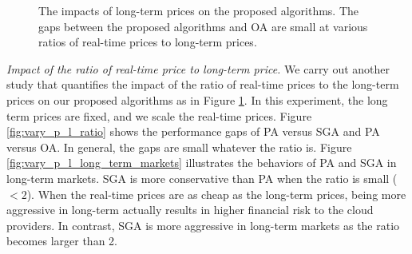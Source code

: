 \begin{figure}[!ht]    
	\centering
	\vspace{-0.5cm}
	\vspace{-0.2cm}
	\caption{The impacts of long-term prices on the proposed algorithms. The gaps between the proposed algorithms and OA are small at various ratios of real-time prices to long-term prices.}
	\label{fig:prices}
\end{figure}

\emph{Impact of the ratio of real-time price to long-term price.} We carry out another study that quantifies the impact of the ratio of real-time prices to the long-term prices on our proposed algorithms as in Figure {\ref{fig:prices}}. In this experiment, the long term prices are fixed, and we scale the real-time prices. Figure {\ref{fig:vary_p_l_ratio}} shows the performance gaps of PA versus SGA and PA versus OA. In general, the gaps are small whatever the ratio is. Figure {\ref{fig:vary_p_l_long_term_markets}} illustrates the behaviors of PA and SGA in long-term markets. SGA is more conservative than PA when the ratio is small ($<2$). When the real-time prices are as cheap as the long-term prices, being more aggressive in long-term actually results in higher financial risk to the cloud providers. In contrast, SGA is more aggressive in long-term markets as the ratio becomes larger than 2.

